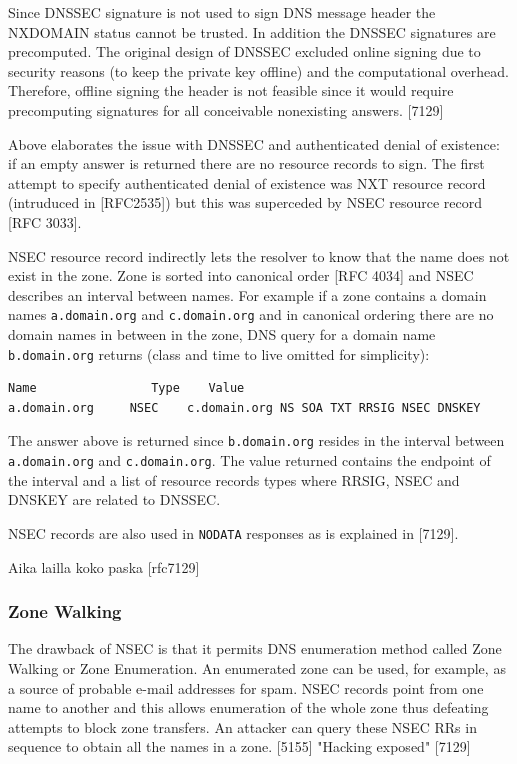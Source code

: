 Since DNSSEC signature is not used to sign DNS message header the NXDOMAIN status cannot be trusted. In addition the DNSSEC signatures are precomputed. The original design of DNSSEC excluded online signing due to security reasons (to keep the private key offline) and the computational overhead. Therefore, offline signing the header is not feasible since it would require precomputing signatures for all conceivable nonexisting answers. [7129]

Above elaborates the issue with DNSSEC and authenticated denial of existence: if an empty answer is returned there are no resource records to sign. The first attempt to specify authenticated denial of existence was NXT resource record (intruduced in [RFC2535]) but this was superceded by NSEC resource record [RFC 3033].

NSEC resource record indirectly lets the resolver to know that the name does not exist in the zone. Zone is sorted into canonical order [RFC 4034] and NSEC describes an interval between names. For example if a zone contains a domain names \texttt{a.domain.org} and \texttt{c.domain.org} and in canonical ordering there are no domain names in between in the zone, DNS query for a domain name \texttt{b.domain.org} returns (class and time to live omitted for simplicity):

\begin{verbatim}
Name	            Type    Value
a.domain.org     NSEC    c.domain.org NS SOA TXT RRSIG NSEC DNSKEY
\end{verbatim}

The answer above is returned since \texttt{b.domain.org} resides in the interval between \texttt{a.domain.org} and \texttt{c.domain.org}. The value returned contains the endpoint of the interval and a list of resource records types where RRSIG, NSEC and DNSKEY are related to DNSSEC.

NSEC records are also used in \texttt{NODATA} responses as is explained in [7129].

Aika lailla koko paska [rfc7129]


\subsubsection{Zone Walking}

The drawback of NSEC is that it permits DNS enumeration method called Zone Walking or Zone Enumeration. An enumerated zone can be used, for example, as a source of probable e-mail addresses for spam. NSEC records point from one name to another and this allows enumeration of the whole zone thus defeating attempts to block zone transfers. An attacker can query these NSEC RRs in sequence to obtain all the names in a zone. [5155] "Hacking exposed" [7129] 

